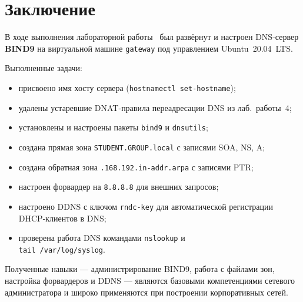 \chapter*{Заключение}
\label{ch:conclusion}

В ходе выполнения лабораторной работы~\cfgLabNumber{} был развёрнут и настроен
DNS-сервер \textbf{BIND9} на виртуальной машине \texttt{gateway}
под управлением Ubuntu~20.04~LTS.

Выполненные задачи:
\begin{itemize}
  \item присвоено имя хосту сервера (\texttt{hostnamectl set-hostname});
  \item удалены устаревшие DNAT-правила переадресации DNS из лаб.~работы~4;
  \item установлены и настроены пакеты \texttt{bind9} и \texttt{dnsutils};
  \item создана прямая зона \texttt{STUDENT.GROUP.local} с записями SOA, NS, A;
  \item создана обратная зона
        \texttt{\cfgLabStudentN.168.192.in-addr.arpa} с записями PTR;
  \item настроен форвардер на \texttt{8.8.8.8} для внешних запросов;
  \item настроено DDNS с ключом \texttt{rndc-key} для автоматической
        регистрации DHCP-клиентов в DNS;
  \item проверена работа DNS командами \texttt{nslookup} и\\
        \texttt{tail /var/log/syslog}.
\end{itemize}

Полученные навыки — администрирование BIND9, работа с файлами зон,
настройка форвардеров и DDNS — являются базовыми компетенциями
сетевого администратора и широко применяются при построении корпоративных сетей.

\endinput
